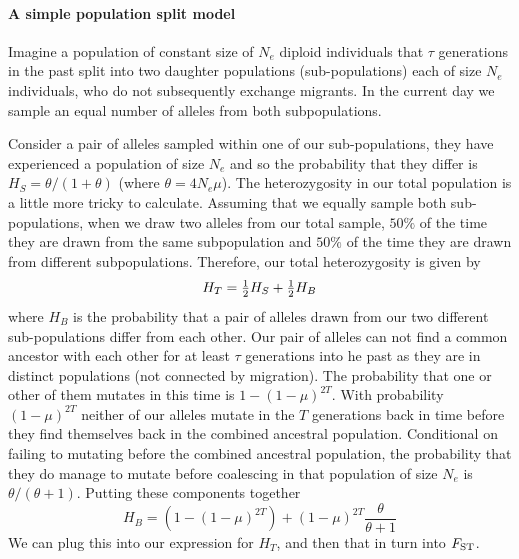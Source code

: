 \paragraph{A simple population split model}
Imagine a population of constant size of $N_e$ diploid individuals that
$\tau$ generations in the past split into two daughter populations (sub-populations)
each of size $N_e$ individuals, who do not subsequently exchange
migrants. In the current day we sample an equal number of alleles
from both subpopulations.

Consider a pair of alleles sampled within one of our
sub-populations, they have experienced a population of size $N_e$
and so the probability that they differ is $H_S = \theta/(1+\theta)$
(where $\theta=4N_e\mu$).
The heterozygosity in our total population is a little more tricky to
calculate. Assuming that we equally sample both sub-populations, when we draw two alleles from our total
sample, $50\%$ of the time they are drawn from the same
subpopulation and $50\%$ of the time they are drawn from different
subpopulations. Therefore, our total heterozygosity is given by
\begin{equation}
H_T = \tfrac{1}{2} H_S + \tfrac{1}{2} H_B
\end{equation}
where $H_B$ is the probability that a pair of alleles drawn from our
two different sub-populations differ from each other. Our pair of
alleles can not find a common ancestor with each other for at least $\tau$
generations into he past as they are in distinct populations (not
connected by migration). The probability that one or other of them
mutates in this time is $1-(1-\mu)^{2T}$. With probability
$(1-\mu)^{2T} $ neither of our alleles mutate in the $T$ generations
back in time before they find themselves back in the combined ancestral 
population. Conditional on failing to mutating before the combined ancestral
population, the probability that they do manage to mutate before
coalescing in that population of size $N_e$ is
$\theta/(\theta+1)$. Putting these components together
\begin{equation}
H_B = \left( 1-(1-\mu)^{2T} \right) + (1-\mu)^{2T}
  \frac{\theta}{\theta+1} 
\end{equation}
We can plug this into our expression for $H_T$, and then that in turn
into $F_{\mathrm{ST}}$.

